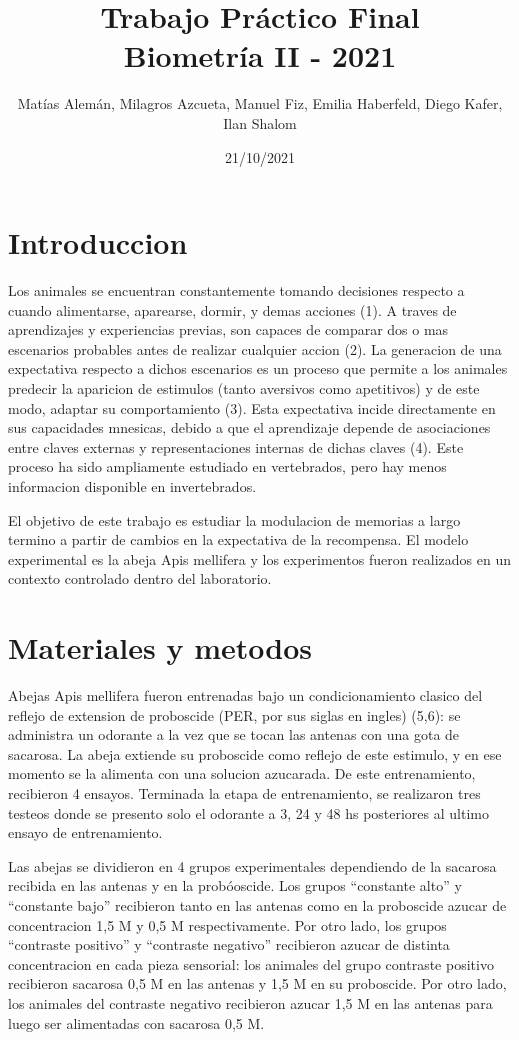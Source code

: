 \documentclass[
]{article}
\title{Trabajo Práctico Final\\
Biometría II - 2021}
\author{Matías Alemán, Milagros Azcueta, Manuel Fiz, Emilia Haberfeld,
Diego Kafer, Ilan Shalom}
\date{21/10/2021}
\begin{document}
\maketitle

\hypertarget{introduccion}{%
\section{Introduccion}\label{introduccion}}

Los animales se encuentran constantemente tomando decisiones respecto a
cuando alimentarse, aparearse, dormir, y demas acciones (1). A traves de
aprendizajes y experiencias previas, son capaces de comparar dos o mas
escenarios probables antes de realizar cualquier accion (2). La
generacion de una expectativa respecto a dichos escenarios es un proceso
que permite a los animales predecir la aparicion de estimulos (tanto
aversivos como apetitivos) y de este modo, adaptar su comportamiento
(3). Esta expectativa incide directamente en sus capacidades mnesicas,
debido a que el aprendizaje depende de asociaciones entre claves
externas y representaciones internas de dichas claves (4). Este proceso
ha sido ampliamente estudiado en vertebrados, pero hay menos informacion
disponible en invertebrados.

El objetivo de este trabajo es estudiar la modulacion de memorias a
largo termino a partir de cambios en la expectativa de la recompensa. El
modelo experimental es la abeja Apis mellifera y los experimentos fueron
realizados en un contexto controlado dentro del laboratorio.

\hypertarget{materiales-y-metodos}{%
\section{Materiales y metodos}\label{materiales-y-metodos}}

Abejas Apis mellifera fueron entrenadas bajo un condicionamiento clasico
del reflejo de extension de proboscide (PER, por sus siglas en ingles)
(5,6): se administra un odorante a la vez que se tocan las antenas con
una gota de sacarosa. La abeja extiende su proboscide como reflejo de
este estimulo, y en ese momento se la alimenta con una solucion
azucarada. De este entrenamiento, recibieron 4 ensayos. Terminada la
etapa de entrenamiento, se realizaron tres testeos donde se presento
solo el odorante a 3, 24 y 48 hs posteriores al ultimo ensayo de
entrenamiento.

Las abejas se dividieron en 4 grupos experimentales dependiendo de la
sacarosa recibida en las antenas y en la probóoscide. Los grupos
``constante alto'' y ``constante bajo'' recibieron tanto en las antenas
como en la proboscide azucar de concentracion 1,5 M y 0,5 M
respectivamente. Por otro lado, los grupos ``contraste positivo'' y
``contraste negativo'' recibieron azucar de distinta concentracion en
cada pieza sensorial: los animales del grupo contraste positivo
recibieron sacarosa 0,5 M en las antenas y 1,5 M en su proboscide. Por
otro lado, los animales del contraste negativo recibieron azucar 1,5 M
en las antenas para luego ser alimentadas con sacarosa 0,5 M.
\end{document}
